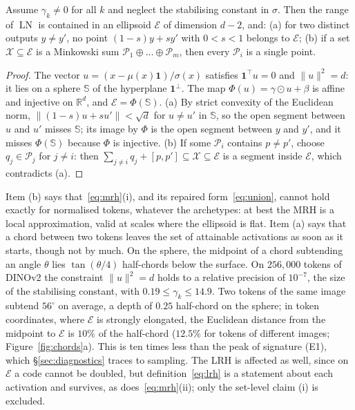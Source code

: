 \documentclass[sigconf,nonacm,screen]{acmart}
\newcommand{\R}{\mathbb{R}}
\newcommand{\LN}{\operatorname{LN}}
\newcommand{\msum}{\oplus}
\newcommand{\one}{\mathbf{1}}
\newcommand{\X}{\mathcal{X}}
\newcommand{\cP}{\mathcal{P}}
\newcommand{\cE}{\mathcal{E}}
\begin{document}
\begin{proposition}
\label{prop:ellipsoid}
Assume $\gamma_k\neq0$ for all $k$ and neglect the stabilising constant in $\sigma$. Then the range of
$\LN$ is contained in an ellipsoid $\cE$ of dimension $d-2$, and:
(a) for two distinct outputs $y\neq y'$, no point $(1-s)y+sy'$ with $0<s<1$ belongs to $\cE$;
(b) if a set $\X\subseteq\cE$ is a Minkowski sum $\cP_1\msum\dots\msum\cP_m$, then every $\cP_i$ is a
single point.
\end{proposition}
\begin{proof}
The vector $u=(x-\mu(x)\one)/\sigma(x)$ satisfies $\one^\top u=0$ and $\|u\|^2=d$: it lies on a sphere $\mathbb{S}$
of the hyperplane $\one^\perp$. The map $\Phi(u)=\gamma\odot u+\beta$ is affine and injective on $\R^d$, and
$\cE=\Phi(\mathbb{S})$. (a) By strict convexity of the Euclidean norm, $\|(1-s)u+su'\|<\sqrt d$ for $u\ne u'$ in
$\mathbb{S}$, so the open segment between $u$ and $u'$ misses $\mathbb{S}$; its image by $\Phi$ is the open segment
between $y$ and $y'$, and it misses $\Phi(\mathbb{S})$ because $\Phi$ is injective. (b) If some $\cP_i$ contains
$p\neq p'$, choose $q_j\in\cP_j$ for $j\neq i$: then $\sum_{j\ne i}q_j+[p,p']\subseteq\X\subseteq\cE$ is a
segment inside $\cE$, which contradicts (a).
\end{proof}

Item (b) says that~\eqref{eq:mrh}(i), and its repaired form~\eqref{eq:union}, cannot hold exactly for
normalised tokens, whatever the archetypes: at best the MRH is a local approximation, valid at scales
where the ellipsoid is flat. Item (a) says that a chord between two tokens
leaves the set of attainable activations as soon as it starts, though not by much. On the sphere, the
midpoint of a chord subtending an angle $\theta$ lies $\tan(\theta/4)$ half-chords below the surface.
On $256{,}000$ tokens of DINOv2 the constraint $\|u\|^2=d$ holds to a relative precision of $10^{-7}$, the
size of the stabilising constant, with $0.19\le\gamma_k\le14.9$. Two tokens of the same image subtend
$56^\circ$ on average, a depth of $0.25$ half-chord on the sphere; in token coordinates, where $\cE$ is
strongly elongated, the Euclidean distance from the midpoint to $\cE$ is $10\%$ of the half-chord
($12.5\%$ for tokens of different images; Figure~\ref{fig:chords}a). This is ten times less than the peak
of signature (E1), which \S\ref{sec:diagnostics} traces to sampling.
The LRH is affected as well, since on $\cE$ a code cannot be doubled, but definition~\eqref{eq:lrh} is a
statement about each activation and survives, as does~\eqref{eq:mrh}(ii); only the set-level claim (i) is
excluded.
\end{document}
